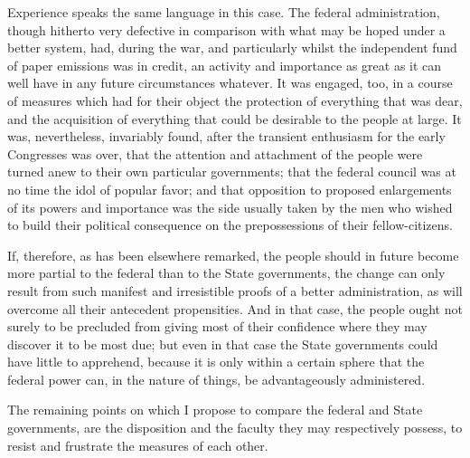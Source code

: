 Experience speaks the same language in this case. 
The federal administration, though hitherto very defective in comparison with what may be hoped under a better system, had, during the war, and particularly whilst the independent fund of paper emissions was in credit, an activity and importance as great as it can well have in any future circumstances whatever. 
It was engaged, too, in a course of measures which had for their object the protection of everything that was dear, and the acquisition of everything that could be desirable to the people at large. 
It was, nevertheless, invariably found, after the transient enthusiasm for the early Congresses was over, that the attention and attachment of the people were turned anew to their own particular governments; that the federal council was at no time the idol of popular favor; and that opposition to proposed enlargements of its powers and importance was the side usually taken by the men who wished to build their political consequence on the prepossessions of their fellow-citizens.

If, therefore, as has been elsewhere remarked, the people should in future become more partial to the federal than to the State governments, the change can only result from such manifest and irresistible proofs of a better administration, as will overcome all their antecedent propensities. 
And in that case, the people ought not surely to be precluded from giving most of their confidence where they may discover it to be most due; but even in that case the State governments could have little to apprehend, because it is only within a certain sphere that the federal power can, in the nature of things, be advantageously administered.

The remaining points on which I propose to compare the federal and State governments, are the disposition and the faculty they may respectively possess, to resist and frustrate the measures of each other.


